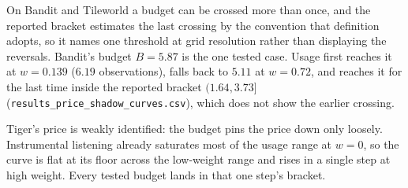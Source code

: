 \documentclass[runningheads]{llncs}
\begin{document}
On Bandit and Tileworld a budget can be crossed more than once, and the reported bracket estimates the last crossing by the convention that definition adopts, so it names one threshold at grid resolution rather than displaying the reversals. Bandit's budget $B{=}5.87$ is the one tested case. Usage first reaches it at $w{=}0.139$ ($6.19$ observations), falls back to $5.11$ at $w{=}0.72$, and reaches it for the last time inside the reported bracket $(1.64, 3.73]$ (\texttt{results\_\allowbreak price\_\allowbreak shadow\_\allowbreak curves.csv}), which does not show the earlier crossing.

Tiger's price is weakly identified: the budget pins the price down only loosely. Instrumental listening already saturates most of the usage range at $w{=}0$, so the curve is flat at its floor across the low-weight range and rises in a single step at high weight. Every tested budget lands in that one step's bracket.
\end{document}
